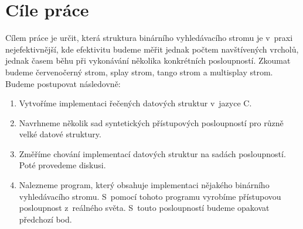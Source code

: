 
\chapter{Cíle práce}

Cílem práce je určit, která struktura binárního vyhledávacího stromu je v~praxi nejefektivnější, kde efektivitu budeme měřit jednak počtem navštívených vrcholů, jednak časem běhu při vykonávání několika konkrétních posloupností. Zkoumat budeme červenočerný strom, splay strom, tango strom a multisplay strom. Budeme postupovat následovně:

\begin{enumerate}
\item Vytvoříme implementaci řečených datových struktur v~jazyce C.
\item Navrhneme několik sad syntetických přístupových posloupností pro různě velké datové struktury.
\item Změříme chování implementací datových struktur na sadách posloupností. Poté provedeme diskusi.
\item Nalezneme program, který obsahuje implementaci nějakého binárního vyhledávacího stromu. S~pomocí tohoto programu vyrobíme přístupovou posloupnost z~reálného světa. S~touto posloupností budeme opakovat předchozí bod.
\end{enumerate}
